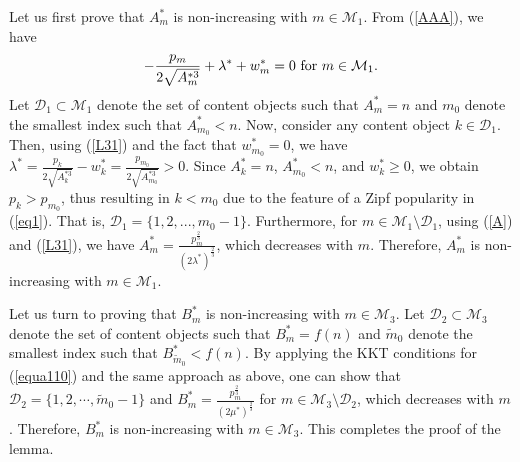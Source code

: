 \documentclass[10pt,journal,compsoc,onecolumn]{IEEEtran}
\begin{document}
Let us first prove that $A_m^*$ is non-increasing with $m \in
\mathcal{M}_1$. From (\ref{AAA}), we have
 \begin{equation}
\label{L31} -\frac{p_m}{2\sqrt{A_m^{*3}}} + \lambda^*+w_m^*=0
\textnormal{ for } m \in \mathcal{M}_1.
\end{equation}
Let $\mathcal{D}_1\subset\mathcal{M}_1$ denote the set of content
objects such that $A_m^*=n$ and $m_0$ denote the smallest index
such that $A_{m_0}^*<n$. Now, consider any content object
$k\in\mathcal{D}_1$. Then, using (\ref{L31}) and the fact that
$w_{m_0}^*=0$, we have
$\lambda^*=\frac{p_{k}}{2\sqrt{A_{k}^{*3}}}-w_{k}^*=\frac{p_{m_0}}{2\sqrt{A_{m_0}^{*3}}}>0$.
Since $A^*_{k}=n$, $A^*_{m_0}<n$, and $w^*_k  \geq 0$, we obtain
$p_{k}>p_{m_0}$, thus resulting in $k<m_0$ due to the feature of a
Zipf popularity in (\ref{eq1}). That is,
$\mathcal{D}_1=\{1,2,...,m_0-1\}$. Furthermore, for $m \in
\mathcal{M}_1\setminus \mathcal{D}_1$, using (\ref{A}) and
(\ref{L31}), we have
 $A_m^* =\frac{ p^{\frac{2}{3}}_m}{(2\lambda^*)^{\frac{2}{3}}}$,
which decreases with $m$. Therefore, $A_m^*$ is non-increasing
with $m\in\mathcal{M}_1$.

Let us turn to proving that $B_m^*$ is non-increasing with $m \in
\mathcal{M}_3$. Let $\mathcal{D}_2\subset\mathcal{M}_3$ denote the
set of content objects such that $B_m^*=f(n)$ and $\tilde{m}_0$
denote the smallest index such that $B_{\tilde{m}_0}^*<f(n)$. By
applying the KKT conditions for (\ref{equa110}) and the same
approach as above, one can show that
$\mathcal{D}_2=\{1,2,\cdots,\tilde{m}_0-1\}$ and
$B_m^*=\frac{p_m^{\frac{2}{3}}}{(2\mu^*)^{\frac{2}{3}}}$ for
$m\in\mathcal{M}_3\setminus \mathcal{D}_2$, which decreases with
$m$. Therefore, $B_m^*$ is non-increasing with
$m\in\mathcal{M}_3$. This completes the proof of the lemma.
\end{document}

